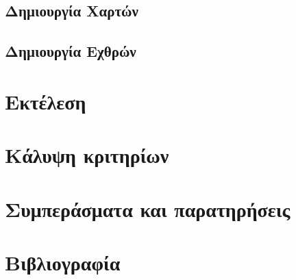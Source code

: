 \documentclass[12pt]{article}
\begin{document}
	\subsection{Δημιουργία Χαρτών}
	
	\subsection{Δημιουργία Εχθρών}
	
	\section{Εκτέλεση}
	
	\section{Κάλυψη κριτηρίων}
	
	\section{Συμπεράσματα και παρατηρήσεις}
	
	\section{Βιβλιογραφία}

	
	
	
\end{document}
